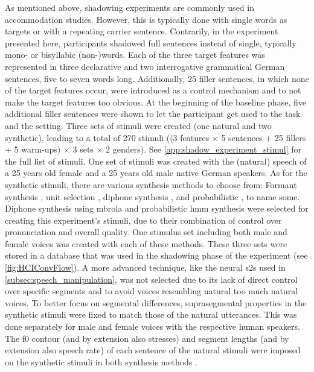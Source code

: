 As mentioned above, shadowing experiments are commonly used in accommodation studies.
However, this is typically done with single words as targets or with a repeating carrier sentence.
Contrarily, in the experiment presented here, participants shadowed full sentences instead of single, typically mono- or bisyllabic (non-)words.
Each of the three target features was represented in three declarative and two interrogative grammatical German sentences, five to seven words long.
Additionally, 25 filler sentences, in which none of the target features occur, were introduced as a control mechanism and to not make the target features too obvious.
At the beginning of the baseline phase, five additional filler sentences were shown to let the participant get used to the task and the setting.
Three sets of stimuli were created (one natural and two synthetic), leading to a total of 270 stimuli ((3 features $\times$ 5 sentences + 25 fillers + 5 warm-ups) $\times$ 3 sets $\times$ 2 genders).
See \cref{app:shadow_experiment_stimul} for the full list of stimuli.
One set of stimuli was created with the (natural) speech of a 25 years old female and a 25 years old male native German speakers.
As for the synthetic stimuli, there are various synthesis methods to choose from:
Formant synthesis \citep[e.g.,][]{Burkhardt2000verification}, unit selection \citep{Hunt1996unit,Black2003unit}, diphone synthesis \citep[e.g.,][]{Dutoit1996mbrola}, and probabilistic \citep[e.g., using \acp{hmm} as described in][]{Zen2005overview, Zen2009statistical}, to name some.
Diphone synthesis using \acl{mbrola} \citep[\acs{mbrola};][]{Dutoit1996mbrola} and probabilistic \ac{hmm} synthesis were selected for creating this experiment's stimuli, due to their combination of control over pronunciation and overall quality.
One stimulus set including both male and female voices was created with each of these methods.
These three sets were stored in a database that was used in the shadowing phase of the experiment (see \cref{fig:HCIConvFlow}).
A more advanced technique, like the neural \ac{s2s} used in \cref{subsec:speech_manipulation}, was not selected due to its lack of direct control over specific segments and to avoid voices resembling natural too much natural voices.
To better focus on segmental differences, suprasegmental properties in the synthetic stimuli were fixed to match those of the natural utterances.
This was done separately for male and female voices with the respective human speakers.
The \acf{f0} contour (and by extension also stresses) and segment lengths (and by extension also speech rate) of each sentence of the natural stimuli were imposed on the synthetic stimuli in both synthesis methods \citep[and see][]{Raveh2017ESSV}.
